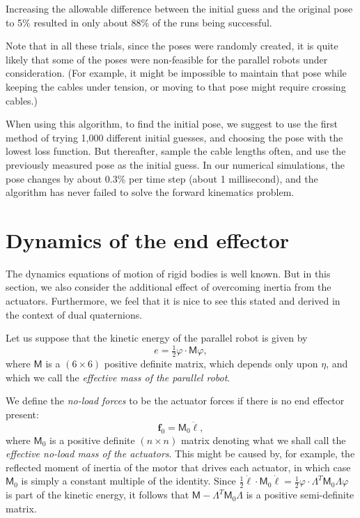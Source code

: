 \documentclass[reqno,12pt]{amsart}
\begin{document}
Increasing the allowable difference between the initial guess and the original pose to 5\% resulted in only about 88\% of the runs being successful.

Note that in all these trials, since the poses were randomly created, it is quite likely that some of the poses were non-feasible for the parallel robots under consideration.  (For example, it might be impossible to maintain that pose while keeping the cables under tension, or moving to that pose might require crossing cables.)

When using this algorithm, to find the initial pose, we suggest to use the first method of trying 1,000 different initial guesses, and choosing the pose with the lowest loss function.  But thereafter, sample the cable lengths often, and use the previously measured pose as the initial guess.  In our numerical simulations, the pose changes by about 0.3\% per time step (about 1 millisecond), and the algorithm has never failed to solve the forward kinematics problem.

\section{Dynamics of the end effector}
\label{dynamics}

The dynamics equations of motion of rigid bodies is well known.  But in this section, we also consider the additional effect of overcoming inertia from the actuators.  Furthermore, we feel that it is nice to see this stated and derived in the context of dual quaternions.

Let us suppose that the kinetic energy of the parallel robot is given by
\begin{equation}
\label{ke}
e = \tfrac12 \varphi \cdot \mathsf M \varphi,
\end{equation}
where $\mathsf M$ is a $(6 \times 6)$ positive definite matrix, which depends only upon $\eta$, and which we call the \emph{effective mass of the parallel robot}.

We define the \emph{no-load forces} to be the actuator forces if there is no end effector present:
\begin{equation}
\bm f_0 = \mathsf M_0 \ddot{\bm \ell},
\end{equation}
where $\mathsf M_0$ is a positive definite $(n\times n)$ matrix denoting what we shall call the \emph{effective no-load mass of the actuators}.  This might be caused by, for example, the reflected moment of inertia of the motor that drives each actuator, in which case $\mathsf M_0$ is simply a constant multiple of the identity.  Since $\tfrac12 \dot{\bm\ell} \cdot \mathsf M_0 \dot{\bm\ell} = \tfrac12 \varphi \cdot \mathsf\Lambda^T \mathsf M_0 \mathsf \Lambda \varphi$ is part of the kinetic energy, it follows that $\mathsf M - \mathsf \Lambda^T \mathsf M_0 \mathsf \Lambda$ is a positive semi-definite matrix.
\end{document}
